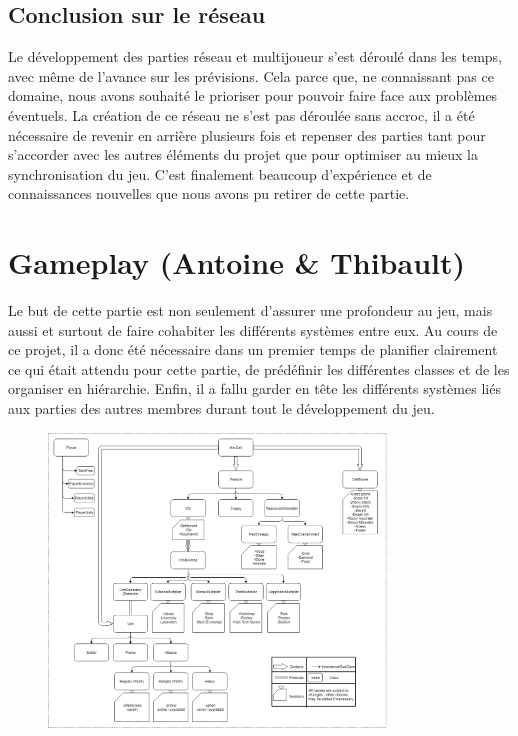 \documentclass[12pt]{report}
\begin{document}
\section{Conclusion sur le réseau}

Le développement des parties réseau et multijoueur s’est déroulé dans les temps,
avec même de l’avance sur les prévisions. Cela parce que, ne connaissant pas ce
domaine, nous avons souhaité le prioriser pour pouvoir faire face aux problèmes
éventuels. La création de ce réseau ne s’est pas déroulée sans accroc, il a été
nécessaire de revenir en arrière plusieurs fois et repenser des parties tant
pour s’accorder avec les autres éléments du projet que pour optimiser au mieux
la synchronisation du jeu. C’est finalement beaucoup d’expérience et de
connaissances nouvelles que nous avons pu retirer de cette partie.

\chapter{Gameplay (Antoine \& Thibault)}

Le but de cette partie est non seulement d’assurer une profondeur au jeu, mais
aussi et surtout de faire cohabiter les différents systèmes entre eux. Au cours
de ce projet, il a donc été nécessaire dans un premier temps de planifier
clairement ce qui était attendu pour cette partie, de prédéfinir les différentes
classes et de les organiser en hiérarchie. Enfin, il a fallu garder en tête les
différents systèmes liés aux parties des autres membres durant tout le
développement du jeu.

\begin{figure}[H]
    \centering
    \includegraphics[width=0.8\textwidth]{../report_1/img/class_hierarchy}
\end{figure}
\end{document}
